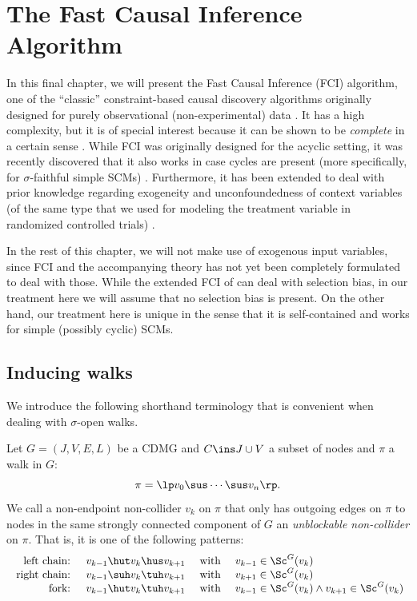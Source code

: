 \section{The Fast Causal Inference Algorithm}\label{sec:fci}


In this final chapter, we will present the Fast Causal Inference (FCI)
algorithm, one of the ``classic'' constraint-based causal discovery algorithms
originally designed for purely observational (non-experimental) data \cite{SMR1995,SMR1999}.
It has a high complexity, but it is of special interest because
it can be shown to be \emph{complete} in a certain sense \cite{Zhang2008_AI}. 
While FCI was originally designed for
the acyclic setting, it was recently discovered that it also works in case cycles
are present (more specifically, for $\sigma$-faithful simple SCMs) \cite{MooijClaassen_UAI_20}.
Furthermore, it has been extended
to deal with prior knowledge regarding exogeneity and unconfoundedness of context
variables (of the same type that we used for modeling the treatment variable in
randomized controlled trials) \cite{Mooij++_JMLR_20}.

In the rest of this chapter, we will not make use of exogenous input variables, since FCI and the accompanying theory has not yet been completely formulated to deal with those.
While the extended FCI of \cite{SMR1999} can deal with selection bias, in our treatment here we will assume that no selection bias is present.
On the other hand, our treatment here is unique in the sense that it is self-contained and works for simple (possibly cyclic) SCMs.

\subsection{Inducing walks}

We introduce the following shorthand terminology that is convenient when dealing with $\sigma$-open walks.
\begin{Def}\label{def:unblockable_noncollider}
  Let $G=(J,V,E,L)$ be a CDMG and $C \ins J \cup V$ a subset of nodes and $\pi$ a walk in $G$:
  \[ \pi =\lp  v_0 \sus \cdots \sus v_n \rp.  \]
  We call a non-endpoint non-collider $v_k$ on $\pi$ that only has outgoing edges on $\pi$ to nodes in the same strongly connected component of $G$ an \emph{unblockable non-collider} on $\pi$. 
  That is, it is one of the following patterns:
  \[\begin{array}{rccl}
    \text{ left chain: } & v_{k-1} \hut v_k \hus v_{k+1} & \text{ with } & v_{k-1} \in \Sc^G(v_{k})\\
    \text{ right chain: } & v_{k-1} \suh v_k \tuh v_{k+1} & \text{ with } & v_{k+1} \in \Sc^G(v_{k})\\
    \text{ fork: } & v_{k-1} \hut v_k \tuh v_{k+1} & \text{ with } & v_{k-1} \in \Sc^G(v_k) \land v_{k+1} \in \Sc^G(v_k)
  \end{array}\]
\end{Def}

